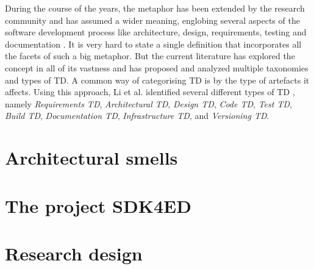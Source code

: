 During the course of the years, the metaphor has been extended by the research community and has assumed a wider meaning, englobing several aspects of the software development process like architecture, design, requirements, testing and documentation \cite{brown_managing_2010}.
It is very hard to state a single definition that incorporates all the facets of such a big metaphor. 
But the current literature has explored the concept in all of its vastness and has proposed and analyzed multiple taxonomies and types of TD.
A common way of categorising TD is by the type of artefacts it affects. Using this approach, Li et al. identified several different types of TD \cite{li_systematic_2015}, namely \emph{Requirements TD}, \emph{Architectural TD}, \emph{Design TD}, \emph{Code TD}, \emph{Test TD}, \emph{Build TD}, \emph{Documentation TD}, \emph{Infrastructure TD}, and \emph{Versioning TD}.



\section{Architectural smells}


\section{The project SDK4ED}

\section{Research design}
